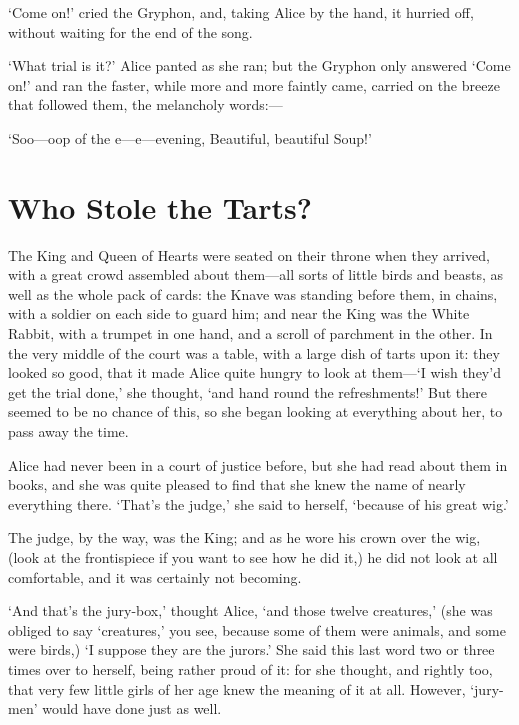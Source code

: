 \documentclass[12pt]{article}
\begin{document}
\begin{Parallel}[p]{}{}
{‘Come on!’ cried the Gryphon, and, taking Alice by the hand, it hurried off, without waiting for the end of the song.

‘What trial is it?’ Alice panted as she ran; but the Gryphon only answered ‘Come on!’ and ran the faster, while more and more faintly came, carried on the breeze that followed them, the melancholy words:—

   ‘Soo—oop of the e—e—evening,
     Beautiful, beautiful Soup!’




\section{Who Stole the Tarts?}

The King and Queen of Hearts were seated on their throne when they arrived, with a great crowd assembled about them—all sorts of little birds and beasts, as well as the whole pack of cards: the Knave was standing before them, in chains, with a soldier on each side to guard him; and near the King was the White Rabbit, with a trumpet in one hand, and a scroll of parchment in the other. In the very middle of the court was a table, with a large dish of tarts upon it: they looked so good, that it made Alice quite hungry to look at them—‘I wish they’d get the trial done,’ she thought, ‘and hand round the refreshments!’ But there seemed to be no chance of this, so she began looking at everything about her, to pass away the time.

Alice had never been in a court of justice before, but she had read about them in books, and she was quite pleased to find that she knew the name of nearly everything there. ‘That’s the judge,’ she said to herself, ‘because of his great wig.’

The judge, by the way, was the King; and as he wore his crown over the wig, (look at the frontispiece if you want to see how he did it,) he did not look at all comfortable, and it was certainly not becoming.

‘And that’s the jury-box,’ thought Alice, ‘and those twelve creatures,’ (she was obliged to say ‘creatures,’ you see, because some of them were animals, and some were birds,) ‘I suppose they are the jurors.’ She said this last word two or three times over to herself, being rather proud of it: for she thought, and rightly too, that very few little girls of her age knew the meaning of it at all. However, ‘jury-men’ would have done just as well.

}
\end{Parallel}
\end{document}
